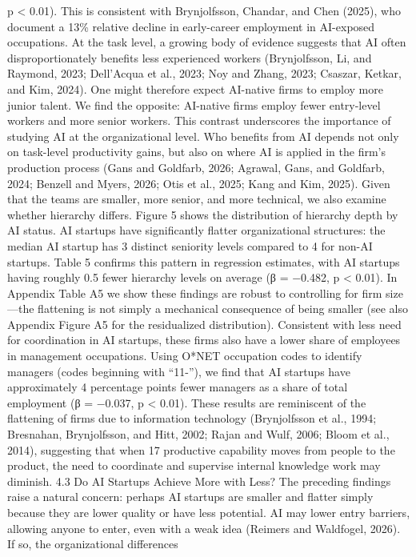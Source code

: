 p < 0.01).
This is consistent with Brynjolfsson, Chandar, and Chen (2025), who document a
13\% relative decline in early-career employment in AI-exposed occupations. At the task level, a
growing body of evidence suggests that AI often disproportionately benefits less experienced workers
(Brynjolfsson, Li, and Raymond, 2023; Dell’Acqua et al., 2023; Noy and Zhang, 2023; Csaszar,
Ketkar, and Kim, 2024). One might therefore expect AI-native firms to employ more junior talent.
We find the opposite: AI-native firms employ fewer entry-level workers and more senior workers.
This contrast underscores the importance of studying AI at the organizational level. Who benefits
from AI depends not only on task-level productivity gains, but also on where AI is applied in the
firm’s production process (Gans and Goldfarb, 2026; Agrawal, Gans, and Goldfarb, 2024; Benzell
and Myers, 2026; Otis et al., 2025; Kang and Kim, 2025).
Given that the teams are smaller, more senior, and more technical, we also examine whether
hierarchy differs. Figure 5 shows the distribution of hierarchy depth by AI status. AI startups
have significantly flatter organizational structures: the median AI startup has 3 distinct seniority
levels compared to 4 for non-AI startups. Table 5 confirms this pattern in regression estimates,
with AI startups having roughly 0.5 fewer hierarchy levels on average (β = −0.482, p < 0.01). In
Appendix Table A5 we show these findings are robust to controlling for firm size—the flattening
is not simply a mechanical consequence of being smaller (see also Appendix Figure A5 for the
residualized distribution).
Consistent with less need for coordination in AI startups, these firms also have a lower share
of employees in management occupations. Using O*NET occupation codes to identify managers
(codes beginning with “11-”), we find that AI startups have approximately 4 percentage points fewer
managers as a share of total employment (β = −0.037, p < 0.01). These results are reminiscent
of the flattening of firms due to information technology (Brynjolfsson et al., 1994; Bresnahan,
Brynjolfsson, and Hitt, 2002; Rajan and Wulf, 2006; Bloom et al., 2014), suggesting that when
17
productive capability moves from people to the product, the need to coordinate and supervise
internal knowledge work may diminish.
4.3
Do AI Startups Achieve More with Less?
The preceding findings raise a natural concern: perhaps AI startups are smaller and flatter simply
because they are lower quality or have less potential. AI may lower entry barriers, allowing anyone
to enter, even with a weak idea (Reimers and Waldfogel, 2026). If so, the organizational differences
